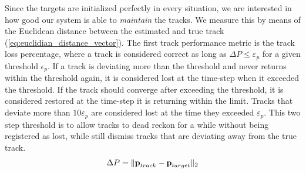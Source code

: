 Since the targets are initialized perfectly in every situation, we are interested in how good our system is able to \emph{maintain} the tracks. We measure this by means of the Euclidean distance between the estimated and true track (\ref{eq:euclidian_distance_vector}). The first track performance metric is the track loss percentage, where a track is considered correct as long as \(\Delta P \leq \varepsilon_p\) for a given threshold \(\epsilon_p\). If a track is deviating more than the threshold and never returns within the threshold again, it is considered lost at the time-step when it exceeded the threshold. If the track should converge after exceeding the threshold, it is considered restored at the time-step it is returning within the limit. Tracks that deviate more than \(10\varepsilon_p\) are considered lost at the time they exceeded \(\varepsilon_p\). This two step threshold is to allow tracks to dead reckon for a while without being registered as lost, while still dismiss tracks that are deviating away from the true track.
\begin{equation}
	\Delta P = \| \boldsymbol{\mathbf{p}}_{track}-\boldsymbol{\mathbf{p}}_{target} \|_2
\label{eq:euclidian_distance_vector}
\end{equation}


